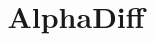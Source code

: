 \documentclass[10pt,conference]{IEEEtran}
\begin{document}
\title{AlphaDiff}

\maketitle















\end{document}
